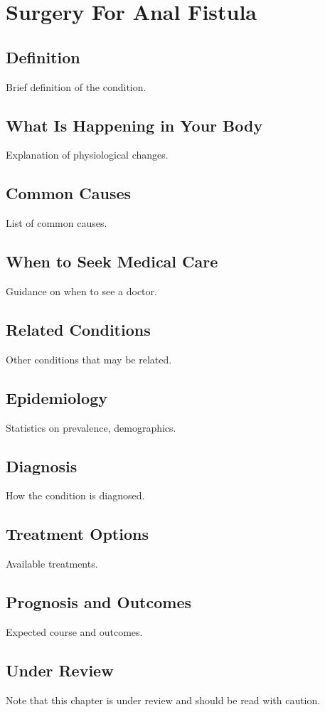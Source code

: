 \chapter{Surgery For Anal Fistula}
\section*{Definition}
Brief definition of the condition.

\section*{What Is Happening in Your Body}
Explanation of physiological changes.

\section*{Common Causes}
List of common causes.

\section*{When to Seek Medical Care}
Guidance on when to see a doctor.

\section*{Related Conditions}
Other conditions that may be related.

\section*{Epidemiology}
Statistics on prevalence, demographics.

\section*{Diagnosis}
How the condition is diagnosed.

\section*{Treatment Options}
Available treatments.

\section*{Prognosis and Outcomes}
Expected course and outcomes.

\section*{Under Review}
Note that this chapter is under review and should be read with caution.
